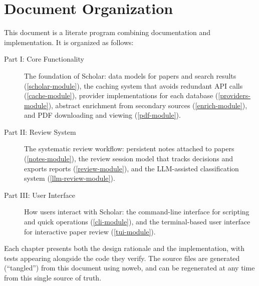 \section{Document Organization}

This document is a literate program combining documentation and implementation.
It is organized as follows:

\begin{description}
\item[Part I: Core Functionality] The foundation of Scholar: data models for
  papers and search results (\cref{scholar-module}), the caching system that
  avoids redundant API calls (\cref{cache-module}), provider implementations
  for each database (\cref{providers-module}), abstract enrichment from
  secondary sources (\cref{enrich-module}), and PDF downloading and viewing
  (\cref{pdf-module}).
\item[Part II: Review System] The systematic review workflow: persistent notes
  attached to papers (\cref{notes-module}), the review session model that
  tracks decisions and exports reports (\cref{review-module}), and the
  LLM-assisted classification system (\cref{llm-review-module}).
\item[Part III: User Interface] How users interact with Scholar: the
  command-line interface for scripting and quick operations
  (\cref{cli-module}), and the terminal-based user interface for interactive
  paper review (\cref{tui-module}).
\end{description}

Each chapter presents both the design rationale and the implementation, with
tests appearing alongside the code they verify.
The source files are generated (\enquote{tangled}) from this document using
noweb, and can be regenerated at any time from this single source of truth.
